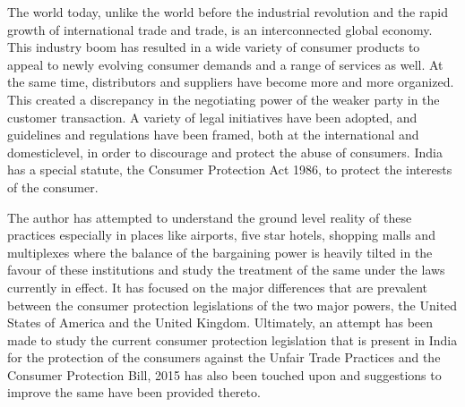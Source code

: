 \setcounter{figure}{0}
\setcounter{table}{0}

\label{2017-art1}

\begin{multicols}{2}


\vspace{.1cm}

\noi
The world today, unlike the world before the industrial revolution and the rapid growth of
international trade and trade, is an interconnected global economy. This industry boom has
resulted in a wide variety of consumer products to appeal to newly evolving consumer demands
and a range of services as well. At the same time, distributors and suppliers have become more
and more organized. This created a discrepancy in the negotiating power of the weaker party
in the customer transaction. A variety of legal initiatives have been adopted, and guidelines and
regulations have been framed, both at the international and domesticlevel, in order to
discourage and protect the abuse of consumers. India has a special statute, the Consumer
Protection Act 1986, to protect the interests of the consumer.

\vspace{.1cm}

\noi
The author has attempted to understand the ground level reality of these practices especially in
places like airports, five star hotels, shopping malls and multiplexes where the balance of the
bargaining power is heavily tilted in the favour of these institutions and study the treatment of
the same under the laws currently in effect. It has focused on the major differences that are
prevalent between the consumer protection legislations of the two major powers, the United
States of America and the United Kingdom. Ultimately, an attempt has been made to study the current consumer protection
legislation that is present in India for the protection of the consumers against the Unfair Trade
Practices and the Consumer Protection Bill, 2015 has also been touched upon and suggestions to
improve the same have been provided thereto.

\vspace{.1cm}


\end{multicols}
